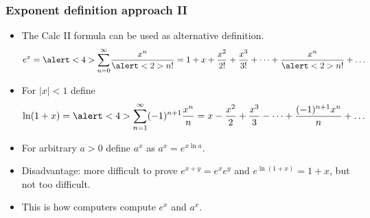 \begin{frame}
\frametitle{Exponent definition approach II }
\begin{itemize}
\item<1-> The Calc II formula can be used as alternative definition.
\[
e^{x}=\alert<4>{\sum_{n=0}^{\infty}} \frac{x^n}{\alert<2>{n!}}= 1+ x+\frac{x^2}{2!}+\frac{x^3}{3!}+\dots + \frac{x^{n}}{\alert<2>{n!}}+\dots
\]
\item<3-> For $|x|<1$ define 
\[
\ln (1+x)=\alert<4>{\sum_{n=1}^{\infty}} (-1)^{n+1}\frac{x^n}{n}=  x-\frac{x^2}{2}+\frac{x^3}{3}-\dots + \frac{(-1)^{n+1}x^{n}}{n}+\dots
\]
\item<5-> For arbitrary $a>0$ define $a^x$ as $a^x=e^{x\ln a}$. 
\item<6-> Disadvantage: more difficult to prove $e^{x+y}=e^{x}e^y$ and $e^{\ln(1+x)}=1+x$, but not too difficult.
\item<7-> This is how computers compute $e^x$ and $a^x$.
\end{itemize}
\end{frame}

